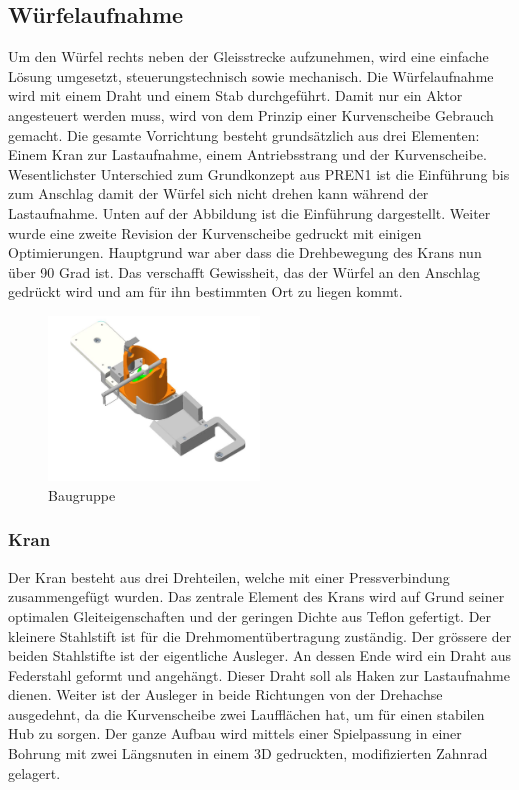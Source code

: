 \documentclass[../../main.tex]{subfiles}
\begin{document}
\subsection{Würfelaufnahme}
Um den Würfel rechts neben der Gleisstrecke aufzunehmen, wird eine einfache Lösung umgesetzt, steuerungstechnisch sowie mechanisch. Die Würfelaufnahme wird mit einem Draht und einem Stab durchgeführt. Damit nur ein Aktor angesteuert werden muss, wird von dem Prinzip einer Kurvenscheibe Gebrauch gemacht. Die gesamte Vorrichtung besteht grundsätzlich aus drei Elementen: Einem Kran zur Lastaufnahme, einem Antriebsstrang und der Kurvenscheibe. Wesentlichster Unterschied zum Grundkonzept aus PREN1 ist die Einführung bis zum Anschlag damit der Würfel sich nicht drehen kann während der Lastaufnahme. Unten auf der Abbildung ist die Einführung dargestellt. Weiter wurde eine zweite Revision der Kurvenscheibe gedruckt mit einigen Optimierungen. Hauptgrund war aber dass die Drehbewegung des Krans nun über 90 Grad ist. Das verschafft Gewissheit, das der Würfel an den Anschlag gedrückt wird und am für ihn bestimmten Ort zu liegen kommt.\\

        \begin{figure}[H]
            \centering
            \includegraphics[width=0.5\textwidth]{FahrgestellBG.JPG}
            \caption {Baugruppe}
        \end{figure}

    \subsubsection{Kran}
         Der Kran besteht aus drei Drehteilen, welche mit einer Pressverbindung zusammengefügt wurden. Das zentrale Element des Krans wird auf Grund seiner optimalen Gleiteigenschaften und der geringen Dichte aus Teflon gefertigt. Der kleinere Stahlstift ist für die Drehmomentübertragung zuständig. Der grössere der beiden Stahlstifte ist der eigentliche Ausleger. An dessen Ende wird ein Draht aus Federstahl geformt und angehängt. Dieser Draht soll als Haken zur Lastaufnahme dienen. Weiter ist der Ausleger in beide Richtungen von der Drehachse ausgedehnt, da die Kurvenscheibe zwei Laufflächen hat, um für einen stabilen Hub zu sorgen. Der ganze Aufbau wird mittels einer Spielpassung in einer Bohrung mit zwei Längsnuten in einem 3D gedruckten, modifizierten Zahnrad gelagert.
\end{document}
